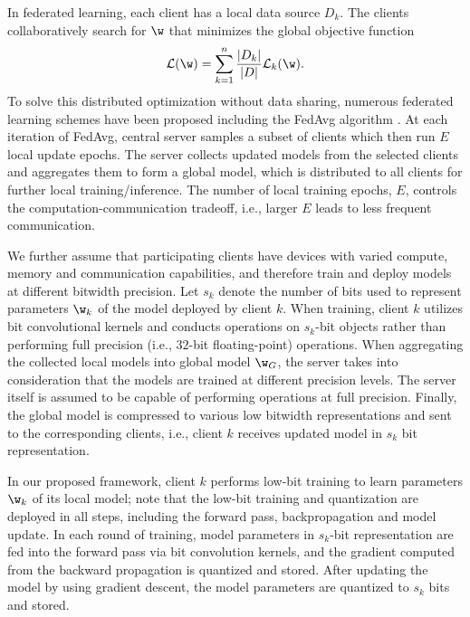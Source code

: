 In federated learning, each client has a local data source $D_k$. The clients collaboratively search for $\w$ that minimizes the global objective function
\begin{align}
    \mathcal{L}(\w) = \sum_{k=1}^n \frac{|D_k|}{|D|}\mathcal{L}_k(\w).
\end{align}
To solve this distributed optimization without data sharing, numerous federated learning schemes have been proposed including the FedAvg algorithm \cite{mcmahan2017communication}. At each iteration of FedAvg, central server samples a subset of clients which then run $E$ local update epochs. The server collects updated models from the selected clients and aggregates them to form a global model, which is distributed to all clients for further local training/inference. The number of local training epochs, $E$, controls the computation-communication tradeoff, i.e., larger $E$ leads to less frequent communication. 

We further assume that participating clients have devices with varied compute, memory and communication capabilities, and therefore train and deploy models at different bitwidth precision. Let $s_k$ denote the number of bits used to represent parameters $\w_k$ of the model deployed by client $k$. When training, client $k$ utilizes bit convolutional kernels and conducts operations on $s_k$-bit objects rather than performing full precision (i.e., $32$-bit floating-point) operations. When aggregating the collected local models into global model $\w_G$, the server takes into consideration that the models are trained at different precision levels. The server itself is assumed to be capable of performing operations at full precision. Finally, the global model is compressed to various low bitwidth representations and sent to the corresponding clients, i.e., client $k$ receives updated model in $s_k$ bit representation.

In our proposed framework, client $k$ performs low-bit training to learn parameters $\w_k$ of its local model; note that the low-bit training and quantization are deployed in all steps, including the forward pass, backpropagation and model update. In each round of training, model parameters in $s_k$-bit representation are fed into the forward pass via bit convolution kernels, and the gradient computed from the backward propagation is quantized and stored. After updating the model by using gradient descent, the model parameters are quantized to $s_k$ bits and stored. 
